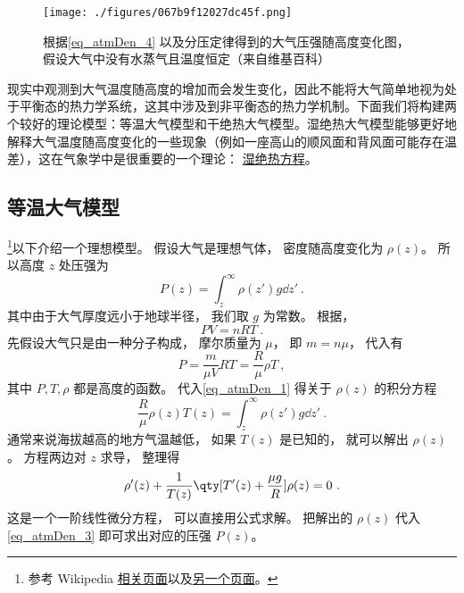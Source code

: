 

\begin{figure}[ht]
\centering
\texttt{[image: ./figures/067b9f12027dc45f.png]}
\caption{根据\autoref{eq_atmDen_4}  以及分压定律得到的大气压强随高度变化图， 假设大气中没有水蒸气且温度恒定（来自维基百科）}\label{fig_atmDen_1}
\end{figure}
现实中观测到大气温度随高度的增加而会发生变化，因此不能将大气简单地视为处于平衡态的热力学系统，这其中涉及到非平衡态的热力学机制。下面我们将构建两个较好的理论模型：等温大气模型和干绝热大气模型。湿绝热大气模型能够更好地解释大气温度随高度变化的一些现象（例如一座高山的顺风面和背风面可能存在温差），这在气象学中是很重要的一个理论：
\href{https://t-inp.readthedocs.io/zh_CN/latest/\%E7\%83\%AD\%E5\%8A\%9B\%E5\%AD\%A6\%E5\%9F\%BA\%E7\%A1\%80.html}{湿绝热方程}。

\subsection{等温大气模型}
\footnote{参考 Wikipedia \href{https://en.wikipedia.org/wiki/Atmospheric_pressure}{相关页面}以及\href{https://en.wikipedia.org/wiki/International_Standard_Atmosphere}{另一个页面}。}以下介绍一个理想模型。 假设大气是理想气体， 密度随高度变化为 $\rho(z)$。 所以高度 $z$ 处压强为
\begin{equation}\label{eq_atmDen_1}
P(z) = \int_{z}^\infty \rho(z') g \dd{z'}~.
\end{equation}
其中由于大气厚度远小于地球半径， 我们取 $g$ 为常数。 根据，
\begin{equation}
PV = n R T~.
\end{equation}
先假设大气只是由一种分子构成， 摩尔质量为 $\mu$， 即 $m = n\mu$， 代入有
\begin{equation}\label{eq_atmDen_3}
P = \frac{m}{\mu V} RT = \frac{R}{\mu} \rho T~,
\end{equation}
其中 $P, T, \rho$ 都是高度的函数。 代入\autoref{eq_atmDen_1} 得关于 $\rho(z)$ 的积分方程
\begin{equation}
\frac{R}{\mu} \rho(z) T(z) = \int_{z}^\infty \rho(z') g \dd{z'}~.
\end{equation}
通常来说海拔越高的地方气温越低， 如果 $T(z)$ 是已知的， 就可以解出 $\rho(z)$。 方程两边对 $z$ 求导， 整理得
\begin{equation}\label{eq_atmDen_5}
\rho'(z)  +  \frac{1}{T(z)}\qty[T'(z) + \frac{\mu g}{R}]\rho(z) = 0~.
\end{equation}
这是一个一阶线性微分方程， 可以直接用公式求解。 把解出的 $\rho(z)$ 代入\autoref{eq_atmDen_3} 即可求出对应的压强 $P(z)$。

